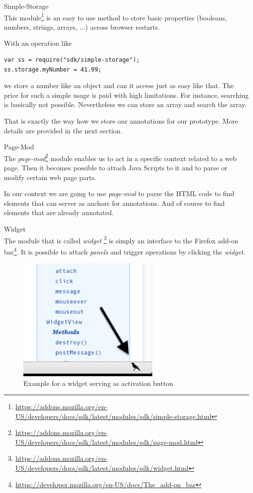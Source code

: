 \begin{description}
\item Simple-Storage\\
This module\footnote{\url{https://addons.mozilla.org/en-US/developers/docs/sdk/latest/modules/sdk/simple-storage.html}} is an easy to use method to store basic properties (booleans, numbers, strings, arrays, ...) across browser restarts. 

With an operation like

\begin{lstlisting}
var ss = require("sdk/simple-storage");
ss.storage.myNumber = 41.99;
\end{lstlisting}

we store a number like an object and can it access just as easy like that. The price for such a simple usage is paid with high limitations. For instance, searching is basically not possible. Nevertheless we can store an array and search the array. 

That is exactly the way how we store our annotations for our prototype. More details are provided in the next section.

\item Page-Mod\\
The \emph{page-mod}\footnote{\url{https://addons.mozilla.org/en-US/developers/docs/sdk/latest/modules/sdk/page-mod.html}} module enables us to act in a specific context related to a web page. Then it becomes possible to attach Java Scripts to it and to parse or modify certain web page parts.

In our context we are going to use \emph{page-mod} to parse the HTML code to find elements that can server as anchors for annotations. And of course to find elements that are already annotated.

\item Widget\\
The module that is called \emph{widget} \footnote{\url{https://addons.mozilla.org/en-US/developers/docs/sdk/latest/modules/sdk/widget.html}} is simply an interface to the Firefox add-on bar\footnote{\url{https://developer.mozilla.org/en-US/docs/The_add-on_bar}}. It is possible to attach \emph{panels} and trigger operations by clicking the \emph{widget}. 

\begin{figure}\centering
		\includegraphics[width=7cm]{images/example-widget.png}
		\caption{Example for a widget serving as activation button}
		\label{example-widget}
\end{figure} 


\end{description}
